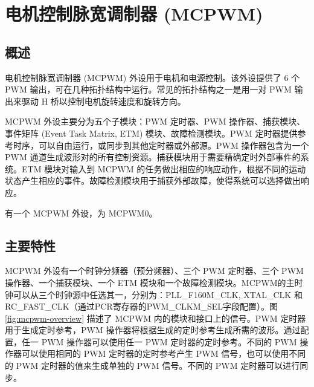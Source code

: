 \documentclass[main\_\_CN.tex]{subfiles}
\begin{document}

\ifglobal
\else
    {\let\clearpage\relax \listoftodos}
    \tableofcontents
\fi



\hypertarget{mcpwm}{}
\chapter{电机控制脉宽调制器 (MCPWM)}
\label{mod:mcpwm}


\section{概述}
电机控制脉宽调制器 (MCPWM) 外设用于电机和电源控制。该外设提供了 6 个 PWM 输出，可在几种拓扑结构中运行。常见的拓扑结构之一是用一对 PWM 输出来驱动 H 桥以控制电机旋转速度和旋转方向。

MCPWM 外设主要分为五个子模块：PWM 定时器、PWM 操作器、捕获模块、事件矩阵 (Event Task Matrix, ETM) 模块、故障检测模块。PWM 定时器提供参考时序，可以自由运行，或同步到其他定时器或外部源。PWM 操作器包含为一个 PWM 通道生成波形对的所有控制资源。捕获模块用于需要精确定时外部事件的系统。ETM 模块对输入到 MCPWM 的任务做出相应的响应动作，根据不同的运动状态产生相应的事件。故障检测模块用于捕获外部故障，使得系统可以选择做出响应。

\chipname{} 有一个 MCPWM 外设，为 MCPWM0。

\section{主要特性}

MCPWM 外设有一个时钟分频器（预分频器）、三个 PWM 定时器、三个 PWM 操作器、一个捕获模块、一个 ETM 模块和一个故障检测模块。MCPWM的主时钟可以从三个时钟源中任选其一，分别为：PLL\_F160M\_CLK, XTAL\_CLK 和 RC\_FAST\_CLK（通过PCR寄存器的PWM\_CLKM\_SEL字段配置）。图 \ref{fig:mcpwm-overview} 描述了 MCPWM 内的模块和接口上的信号。PWM 定时器用于生成定时参考，PWM 操作器将根据生成的定时参考生成所需的波形。通过配置，任一 PWM 操作器可以使用任一 PWM 定时器的定时参考。不同的 PWM 操作器可以使用相同的 PWM 定时器的定时参考产生 PWM 信号，也可以使用不同的 PWM 定时器的值来生成单独的 PWM 信号。不同的 PWM 定时器可以进行同步。
\end{document}
